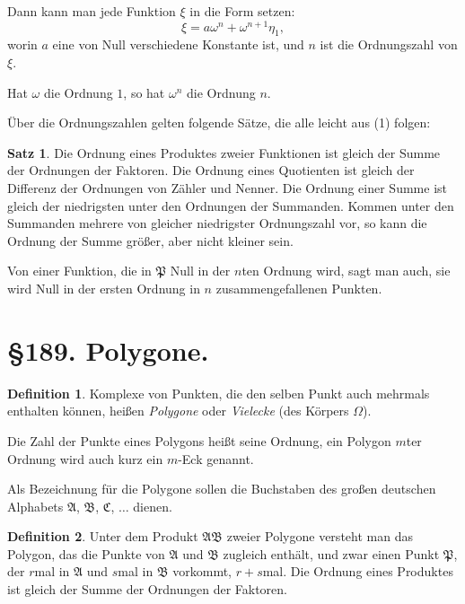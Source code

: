 \documentclass[12pt,a4paper]{article}
\theoremstyle{definition}
\newtheorem{defin}{Definition}[section]
\newtheorem{satz}{Satz}[section]
\begin{document}
Dann kann man jede Funktion $\xi$ in die Form setzen:
\begin{equation}
\xi = a\omega^n + \omega^{n+1}\eta_1,
\end{equation}
worin $a$ eine von Null verschiedene Konstante ist, und $n$ ist die Ordnungszahl von $\xi$.

Hat $\omega$ die Ordnung $1$, so hat $\omega^n$ die Ordnung $n$.

Über die Ordnungszahlen gelten folgende Sätze, die alle leicht aus (1) folgen:

\begin{satz}
Die Ordnung eines Produktes zweier Funktionen ist gleich der Summe der Ordnungen der Faktoren. Die Ordnung eines Quotienten ist gleich der Differenz der Ordnungen von Zähler und Nenner. Die Ordnung einer Summe ist gleich der niedrigsten unter den Ordnungen der Summanden. Kommen unter den Summanden mehrere von gleicher niedrigster Ordnungszahl vor, so kann die Ordnung der Summe größer, aber nicht kleiner sein.
\end{satz}

Von einer Funktion, die in $\mathfrak{P}$ Null in der $n$ten Ordnung wird, sagt man auch, sie wird Null in der ersten Ordnung in $n$ zusammengefallenen Punkten.

\newpage
\section*{\S 189. Polygone.}

\begin{defin}
Komplexe von Punkten, die den selben Punkt auch mehrmals enthalten können, heißen \emph{Polygone} oder \emph{Vielecke} (des Körpers $\Omega$).
\end{defin}

Die Zahl der Punkte eines Polygons heißt seine Ordnung, ein Polygon $m$ter Ordnung wird auch kurz ein $m$-Eck genannt.

Als Bezeichnung für die Polygone sollen die Buchstaben des großen deutschen Alphabets $\mathfrak{A}$, $\mathfrak{B}$, $\mathfrak{C}$, $\ldots$ dienen.

\begin{defin}
Unter dem Produkt $\mathfrak{A}\mathfrak{B}$ zweier Polygone versteht man das Polygon, das die Punkte von $\mathfrak{A}$ und $\mathfrak{B}$ zugleich enthält, und zwar einen Punkt $\mathfrak{P}$, der $r$mal in $\mathfrak{A}$ und $s$mal in $\mathfrak{B}$ vorkommt, $r + s$mal. Die Ordnung eines Produktes ist gleich der Summe der Ordnungen der Faktoren.
\end{defin}
\end{document}
